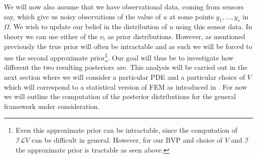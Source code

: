 We will now also assume that we have observational data, coming from sensors say, which give us noisy observations of the value of $u$ at some points $y_{1},\dots,y_{s}$ in $\Omega$. We wish to update our belief in the distribution of $u$ using this sensor data. In theory we can use either of the $\nu_{i}$ as prior distributions. However, as mentioned previously the true prior will often be intractable and as such we will be forced to use the second approximate prior\footnote{Even this approximate prior can be intractable, since the computation of $\mathcal{I}\mathcal{L}V$ can be difficult in general. However, for our BVP and choice of $V$ and $\mathcal{I}$ the approximate prior is tractable as seen above.}. Our goal will thus be to investigate how different the two resulting posteriors are. This analysis will be carried out in the next section where we will consider a particular PDE and a particular choice of $V$ which will correspond to a statistical version of FEM as introduced in \textcolor{blue}{\citep{girolami2019statistical}}. For now we will outline the computation of the posterior distributions for the general framework under consideration.

